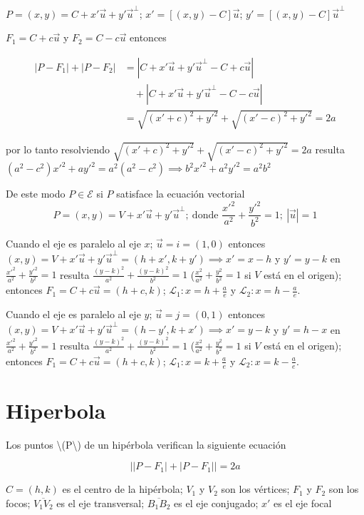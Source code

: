 \documentclass[12pt,]{report}
\theoremstyle{definition}
\theoremstyle{definition}
\theoremstyle{definition}
\theoremstyle{remark}
\begin{document}
\(P=(x,y)=C+x'\vec{u}+y'\vec{u}^\perp\); \(x'=[(x,y)-C]\vec{u}\); \(y'=[(x,y)-C]\vec{u}^\perp\)

\(F_1=C+c\vec{u}\) y \(F_2=C-c\vec{u}\) entonces

\begin{align*}
\left|P-F_1\right|+\left|P-F_2\right|&=\left|C+x'\vec{u}+y'\vec{u}^\perp-C+c\vec{u}\right|\\
&\quad+\left|C+x'\vec{u}+y'\vec{u}^\perp-C-c\vec{u}\right|\\
&=\sqrt{(x'+c)^2+y'^2}+\sqrt{(x'-c)^2+y'^2}=2a\end{align*}

por lo tanto resolviendo \(\sqrt{(x'+c)^2+y'^2}+\sqrt{(x'-c)^2+y'^2}=2a\) resulta \((a^2-c^2)x'^2+ay'^2=a^2(a^2-c^2)\implies b^2x'^2+a^2y'^2=a^2b^2\)

De este modo \(P\in\mathcal{E}\) si \(P\) satisface la ecuación vectorial \[P=(x,y)=V+x'\vec{u}+y'\vec{u}^\perp;\: \text{donde } \frac{x'^2}{a^2}+\frac{y'^2}{b^2}=1; \:\left|\vec{u}\right|=1\]

Cuando el eje es paralelo al eje \(x\); \(\vec{u}=i=(1,0)\) entonces \((x,y)=V+x'\vec{u}+y'\vec{u}^\perp=(h+x',k+y')\implies x'=x-h\) y \(y'=y-k\) en \(\frac{x'^2}{a^2}+\frac{y'^2}{b^2}=1\) resulta \(\frac{(y-k)^2}{a^2}+\frac{(y-k)^2}{b^2}=1\) (\(\frac{x^2}{a^2}+\frac{y^2}{b^2}=1\) si \(V\) está en el origen); entonces \(F_1=C+c\vec{u}=(h+c,k)\); \(\mathcal{L}_1: x=h+\frac{a}{e}\) y \(\mathcal{L}_2: x=h-\frac{a}{e}\).

Cuando el eje es paralelo al eje \(y\); \(\vec{u}=j=(0,1)\) entonces \((x,y)=V+x'\vec{u}+y'\vec{u}^\perp=(h-y',k+x')\implies x'=y-k\) y \(y'=h-x\) en \(\frac{x'^2}{a^2}+\frac{y'^2}{b^2}=1\) resulta \(\frac{(y-k)^2}{a^2}+\frac{(y-k)^2}{b^2}=1\) (\(\frac{x^2}{a^2}+\frac{y^2}{b^2}=1\) si \(V\) está en el origen); entonces \(F_1=C+c\vec{u}=(h+c,k)\); \(\mathcal{L}_1: x=k+\frac{a}{e}\) y \(\mathcal{L}_2: x=k-\frac{a}{e}\).

\hypertarget{hiperbola}{%
\chapter{Hiperbola}\label{hiperbola}}

Los puntos \textbackslash{}(P\textbackslash{}) de un hipérbola verifican la siguiente ecuación

\[\left|\left|P-F_1\right|+\left|P-F_1\right|\right|=2a\]

\(C=(h,k)\) es el centro de la hipérbola; \(V_1\) y \(V_2\) son los vértices; \(F_1\) y \(F_2\) son los focos; \(\overline{V_1V_2}\) es el eje transversal; \(\overline{B_1B_2}\) es el eje conjugado; \(x'\) es el eje focal
\end{document}
